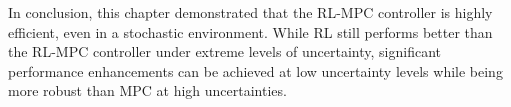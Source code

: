 In conclusion, this chapter demonstrated that the RL-MPC controller is highly efficient, even in a stochastic environment. While RL still performs better than the RL-MPC controller under extreme levels of uncertainty, significant performance enhancements can be achieved at low uncertainty levels while being more robust than MPC at high uncertainties.

